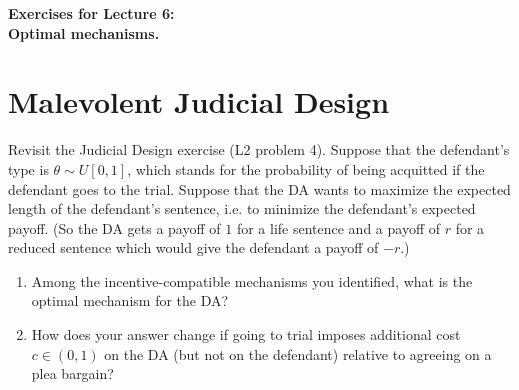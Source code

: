 \documentclass[a4paper]{article}
\newif\ifsolutions
\begin{document}
\begin{center}
		\LARGE\textbf{Exercises for Lecture 6:\\ Optimal mechanisms.}
\end{center}



\section{Malevolent Judicial Design}
	Revisit the Judicial Design exercise (L2 problem 4). Suppose that the defendant's type is $\theta \sim U[0,1]$, which stands for the probability of being acquitted if the defendant goes to the trial. Suppose that the DA wants to maximize the expected length of the defendant's sentence, i.e. to minimize the defendant's expected payoff. (So the DA gets a payoff of $1$ for a life sentence and a payoff of $r$ for a reduced sentence which would give the defendant a payoff of $-r$.)  
	\begin{enumerate}
		\item Among the incentive-compatible mechanisms you identified, what is the optimal mechanism for the DA?
		\item How does your answer change if going to trial imposes additional cost $c \in (0,1)$ on the DA (but not on the defendant) relative to agreeing on a plea bargain?
	\end{enumerate}
	
\ifsolutions
\end{document}
